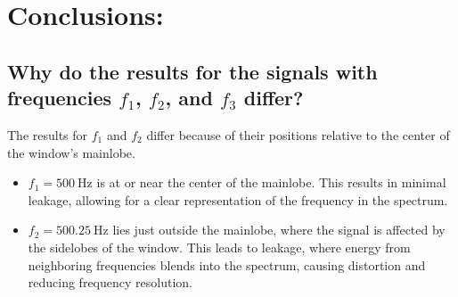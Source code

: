 \documentclass[12pt]{article}
\begin{document}
\FloatBarrier
\vfill

\section{Conclusions:}
\subsection*{Why do the results for the signals with frequencies \(f_1\), \(f_2\), and \(f_3\) differ?}
The results for \(f_1\) and \(f_2\) differ because of their positions relative to the center of the window's mainlobe.

\begin{itemize}
    \item \(f_1 = 500 \ \text{Hz}\) is at or near the center of the mainlobe. This results in minimal leakage, allowing for a clear representation of the frequency in the spectrum.
    \item \(f_2 = 500.25 \ \text{Hz}\) lies just outside the mainlobe, where the signal is affected by the sidelobes of the window. This leads to leakage, where energy from neighboring frequencies blends into the spectrum, causing distortion and reducing frequency resolution.
\end{itemize}
\end{document}

